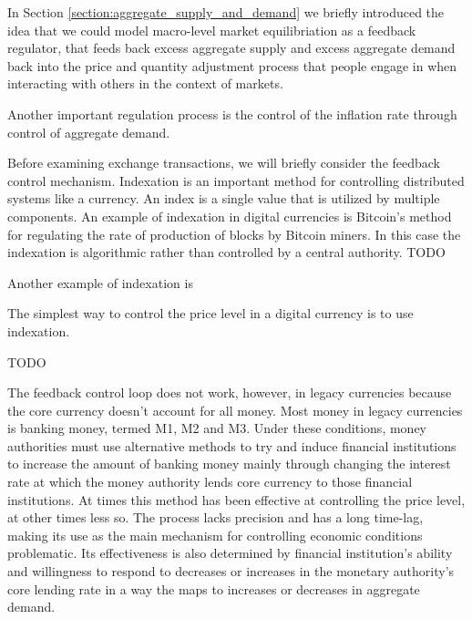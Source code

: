 In Section \ref{section:aggregate_supply_and_demand} we briefly introduced the idea that we could model
macro-level market equilibriation as a feedback regulator, that feeds back excess aggregate supply
and excess aggregate demand back into the price and quantity adjustment process that people engage
in when interacting with others in the context of markets. 

Another important regulation process is the control of the inflation rate through control of
aggregate demand.

Before examining exchange transactions, we will briefly consider the feedback control mechanism.
Indexation is an important method for controlling distributed systems like a currency. An index is a
single value that is utilized by multiple components. An example of indexation in digital currencies
is Bitcoin's method for regulating the rate of production of blocks by Bitcoin miners. In this case
the indexation is algorithmic rather than controlled by a central authority. TODO

Another example of indexation is 

The simplest way to control the price level in a digital currency is to use indexation.





TODO

The feedback control loop does not work, however, in legacy currencies because the core currency
doesn't account for all money. Most money in legacy currencies is banking money, termed M1, M2 and
M3. Under these conditions, money authorities must use alternative methods to try and induce
financial institutions to increase the amount of banking money mainly through changing the interest
rate at which the money authority lends core currency to those financial institutions. At times this
method has been effective at controlling the price level, at other times less so. The process lacks
precision and has a long time-lag, making its use as the main mechanism for controlling economic
conditions problematic. Its effectiveness is also determined by financial institution's ability and
willingness to respond to decreases or increases in the monetary authority's core lending rate in a
way the maps to increases or decreases in aggregate demand.

